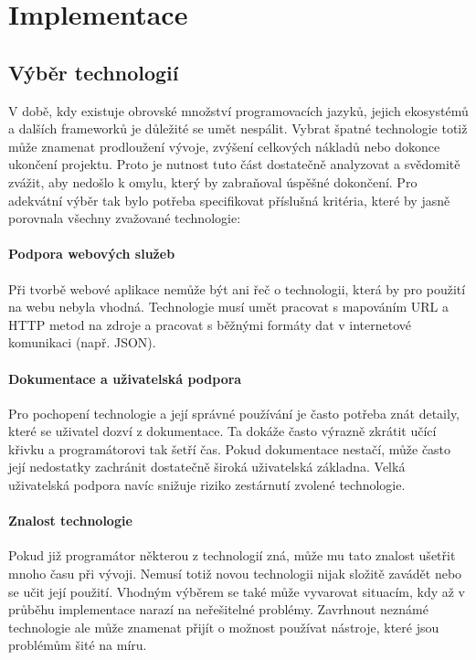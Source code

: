 \chapter{Implementace}

\section{Výběr technologií}

\indent

V době, kdy existuje obrovské množství programovacích jazyků, jejich ekosystémů a dalších frameworků je důležité se umět nespálit. 
Vybrat špatné technologie totiž může znamenat prodloužení vývoje, zvýšení celkových nákladů nebo dokonce ukončení projektu.
Proto je nutnost tuto část dostatečně analyzovat a svědomitě zvážit, aby nedošlo k omylu, který by zabraňoval úspěšné dokončení.
Pro adekvátní výběr tak bylo potřeba specifikovat příslušná kritéria, které by jasně porovnala všechny zvažované technologie:

\subsubsection*{Podpora webových služeb}
Při tvorbě webové aplikace nemůže být ani řeč o technologii, která by pro použití na webu nebyla vhodná. Technologie musí
umět pracovat s mapováním URL a HTTP metod na zdroje a pracovat s běžnými formáty dat v internetové komunikaci (např. JSON).

\subsubsection*{Dokumentace a uživatelská podpora}
Pro pochopení technologie a její správné používání je často potřeba znát detaily, které se uživatel dozví z dokumentace.
Ta dokáže často výrazně zkrátit učící křivku a programátorovi tak šetří čas. Pokud dokumentace nestačí, může často její
nedostatky zachránit dostatečně široká uživatelská základna. Velká uživatelská podpora navíc snižuje riziko zestárnutí zvolené technologie.

\subsubsection*{Znalost technologie}
Pokud již programátor některou z technologií zná, může mu tato znalost ušetřit mnoho času při vývoji. Nemusí totiž novou technologii
nijak složitě zavádět nebo se učit její použití. Vhodným výběrem se také může vyvarovat situacím, kdy až v průběhu implementace narazí
na neřešitelné problémy. Zavrhnout neznámé technologie ale může znamenat přijít o možnost používat nástroje, které jsou problémům šité na míru. 

